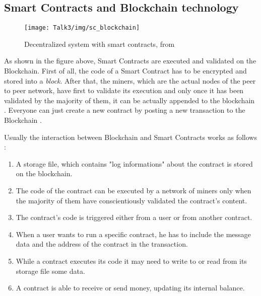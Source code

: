 




\subsection{Smart Contracts and Blockchain technology}
           \begin{figure}[H]
         \begin{center}
         \texttt{[image: Talk3/img/sc\_blockchain]}
         \end{center}
         \caption{Decentralized system with smart contracts, from \cite{paper3}}
         \label{label}
       \end{figure}

As shown in the figure above, Smart Contracts are executed and validated on the Blockchain. First of all, the code of a Smart Contract has to be encrypted \cite{yo} and stored into a \textit{block}. 
After that, the miners, which are the actual nodes of the peer to peer network, have first to validate its execution and only once it has been validated by the majority of them, it can be actually appended to the blockchain \cite{SC2}. 
Everyone can just create a new contract by posting a new transaction to the Blockchain \cite{paper3}.

Usually the interaction between Blockchain and Smart Contracts works as follows \cite{paper3}: 

\begin{enumerate}
\item A storage file, which contains "log informations" about the contract is stored on the blockchain. 
\item The code of the contract can be executed by a network of miners only when the majority of them have conscientiously validated the contract's content.
\item The contract's code is triggered either from a user or from another contract.
\item When a user wants to run a specific contract, he has to include the message data and the address of the contract in the transaction.   
\item While a contract executes its code it may need to write to or read from its storage file some data. 
\item A contract is able to receive or send money, updating its internal balance.
\end{enumerate}

